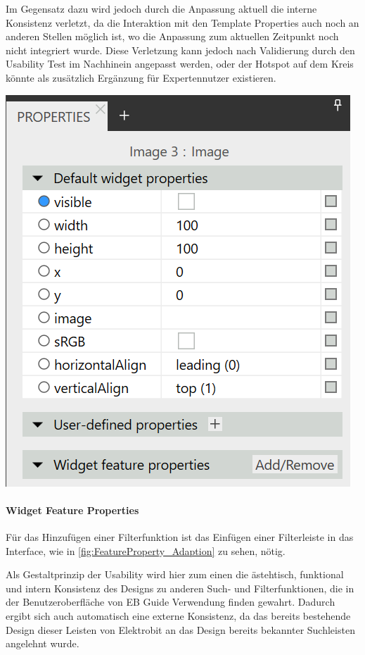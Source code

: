 Im Gegensatz dazu wird jedoch durch die Anpassung aktuell die interne Konsistenz verletzt, da die Interaktion mit den Template Properties auch noch an anderen Stellen möglich ist, wo die Anpassung zum aktuellen Zeitpunkt noch nicht integriert wurde.
Diese Verletzung kann jedoch nach Validierung durch den Usability Test im Nachhinein angepasst werden, oder der Hotspot auf dem Kreis könnte als zusätzlich Ergänzung für Expertennutzer existieren.

\begin{center}
  \includegraphics[scale=0.8]{figures/TemplateProperties_Adaption.png}
  \label{fig:TemplateProperties_Adaption}
\end{center}


\paragraph{Widget Feature Properties}
Für das Hinzufügen einer Filterfunktion ist das Einfügen einer Filterleiste in das Interface, wie in \cref{fig:FeatureProperty_Adaption} zu sehen, nötig.

Als Gestaltprinzip der Usability wird hier zum einen die ästehtisch, funktional und intern Konsistenz des Designs zu anderen Such- und Filterfunktionen, die in der Benutzeroberfläche von EB Guide Verwendung finden gewahrt.
Dadurch ergibt sich auch automatisch eine externe Konsistenz, da das bereits bestehende Design dieser Leisten von Elektrobit an das Design bereits bekannter Suchleisten angelehnt wurde.

